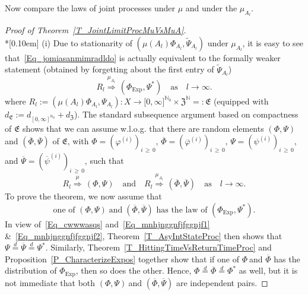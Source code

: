 \documentclass[10pt]{amsart}
\theoremstyle{definition}\newtheorem{defi}[theo]{Definition}\newtheorem{rema}[theo]{Remark}\newtheorem{exam}[theo]{Example}\newtheorem{exem}[theo]{Example}\newtheorem{nota}[theo]{Notation}
\newcommand{\Expl}{\mathrm{Exp}}
\newcommand{\frkE}{\mathfrak{E}}
\newcommand{\frkZ}{\mathfrak{Z}}
\newcommand{\bbN}{\mathbb{N}}
\begin{document}
Now compare the laws of joint processes under $\mu$ and under the $\mu_{A_{l}}$.

\begin{proof}[{Proof of Theorem~\ref{T_JointLimitProcMuVsMuA}}]\ \\*[0.10em]
\noindent (i) Due to stationarity of $(\mu(A_{l})\Phi_{A_{l}},\widetilde{\Psi}_{A_{l}})$ under $\mu_{A_{l}}$, it is easy to see that~\eqref{Eq_jomiasanmimradldo} is actually equivalent to the formally weaker statement (obtained by forgetting about the first entry of $\widetilde{\Psi}_{A_{l}}$)
\begin{equation}
R_{l}\overset{\mu_{A_{l}}}{\Longrightarrow}\,\left(\Phi_{\Expl},\Psi^{\ast}\right)\quad\text{as}\quad l\rightarrow\infty.
\end{equation}
where $R_{l}:=(\mu(A_{l})\Phi_{A_{l}},\Psi_{A_{l}}):X\rightarrow
\lbrack0,\infty]^{\bbN_{0}}\times\frkZ^{\bbN} =:\frkE$ (equipped with $d_{\frkE}:=d_{[0,\infty]^{\bbN _{0}}}+d_{\frkZ}$). The standard subsequence argument based on compactness of $\frkE$ shows that we can assume w.l.o.g. that there are random elements $(\Phi,\Psi)$ and $(\overline{\Phi},\overline{\Psi})$ of $\frkE$, with $\Phi=(\varphi^{(i)})_{i\,\geq\,0}$, $\overline{\Phi }=(\overline{\varphi}^{(i)})_{i\,\geq\,0}$, $\Psi=(\psi^{(i)})_{i\,\geq\,0}$, and $\overline{\Psi}=(\overline{\psi}^{(i)})_{i\,\geq\,0}$, such that
\begin{equation}\label{Eq_cwwwasqs}
R_{l}\overset{\mu}{\Longrightarrow}\,(\Phi,\Psi)\quad\text{and} \quad R_{l}\overset{\mu_{A_{l}}}{\Longrightarrow}\,\left(\overline{\Phi},\overline{\Psi}\right)\quad\text{as}\quad l\rightarrow\infty. 
\end{equation}
To prove the theorem, we now assume that
\begin{equation}
\text{one of }(\Phi,\Psi)\; \text{and}\;\left(\overline{\Phi},\overline{\Psi}\right)\text{ has the law of }\left(\Phi_{\Expl},\Psi^{\ast}\right)\text{.}
\end{equation}
In view of~\eqref{Eq_cwwwasqs} and~\eqref{Eq_mnhjnggnfjfggnjf1} \&~\eqref{Eq_mnhjnggnfjfggnjf2}, Theorem~\ref{T_AsyIntStateProc} then shows that $\Psi\overset{d}{=}\overline{\Psi}\overset{d}{=}\Psi^{\ast}$. Similarly, Theorem~\ref{T_HittingTimeVsReturnTimeProc} and Proposition~\ref{P_CharacterizeExpos} together show that if one of $\Phi\ $and $\overline{\Phi}$ has the distribution of $\Phi_{\Expl}$, then so does the other. Hence, $\Phi\overset{d}{=}\overline{\Phi}\overset{d}{=}\Phi^{\ast}$ as well, but it is not immediate that both $(\Phi,\Psi)\ $and $(\overline {\Phi},\overline{\Psi})$ are independent pairs.



\end{proof}
\end{document}
